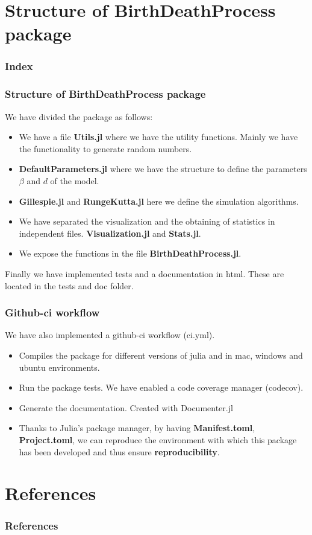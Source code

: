 \documentclass[10pt, usenames, dvipsnames, xcolor=table]{beamer}
\begin{document}
\section{Structure of BirthDeathProcess package}
\begin{frame}
  \frametitle{Index}
  \tableofcontents[currentsection]
\end{frame}
\begin{frame}
\frametitle{Structure of BirthDeathProcess package}
We have divided the package as follows:
\begin{itemize}
\item We have a file \textbf{Utils.jl} where we have the utility functions. Mainly we have the functionality to generate random numbers.
\item \textbf{DefaultParameters.jl} where we have the structure to define the parameters $\beta$ and $d$ of the model.
\item \textbf{Gillespie.jl} and \textbf{RungeKutta.jl} here we define the simulation algorithms.
\item We have separated the visualization and the obtaining of statistics in independent files. \textbf{Visualization.jl} and \textbf{Stats.jl}.
\item We expose the functions in the file \textbf{BirthDeathProcess.jl}.
\end{itemize}
Finally we have implemented tests and a documentation in html. These are located in the tests and doc folder.
\end{frame}

\begin{frame}
\frametitle{Github-ci workflow}
We have also implemented a github-ci workflow (ci.yml).
\begin{itemize}
\item Compiles the package for different versions of julia and in mac, windows and ubuntu environments.
\item Run the package tests. We have enabled a code coverage manager (codecov).
\item Generate the documentation. Created with Documenter.jl
\item Thanks to Julia's package manager, by having \textbf{Manifest.toml}, \textbf{Project.toml}, we can reproduce the environment with which this package has been developed and thus ensure \textbf{reproducibility}.
\end{itemize}
\end{frame}


\nocite{*} 
\section{References}
\begin{frame}[allowframebreaks]
\frametitle{References}




\end{frame}
\end{document}
